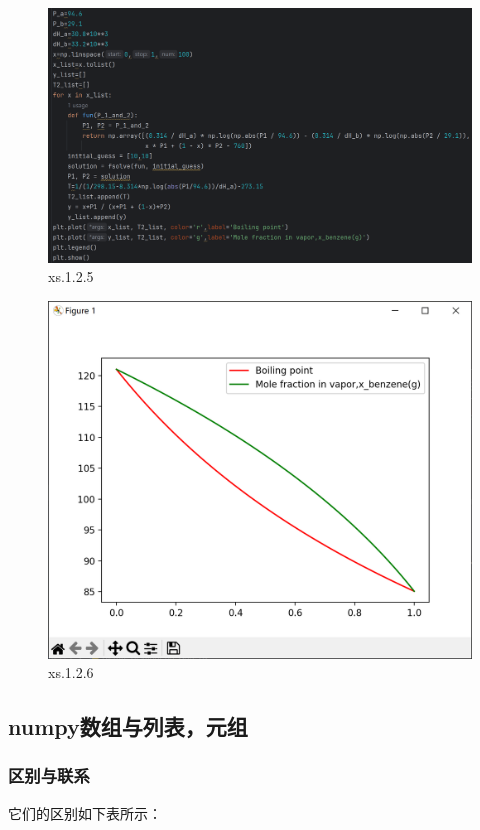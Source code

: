 \documentclass[12pt]{article}
\begin{document}
\begin{figure}[H]
    \centering
    \includegraphics[width=1\linewidth]{解方程 program4.png}
    \caption{xs.1.2.5}
    \label{fig:enter-label}
\end{figure}
\begin{figure}[H]
    \centering
    \includegraphics[width=0.75\linewidth]{解方程 Pic1.png}
    \caption{xs.1.2.6}
    \label{fig:enter-label}
\end{figure}

\subsection{numpy数组与列表，元组}\label{numpy数组与列表，元组}
\subsubsection{区别与联系}
它们的区别如下表所示：
\end{document}
